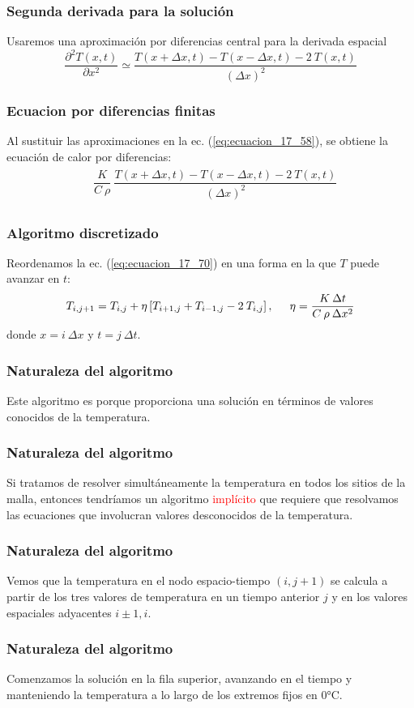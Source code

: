 \begin{frame}
\frametitle{Segunda derivada para la solución}
Usaremos una aproximación por diferencias central para la derivada espacial
\begin{equation}
\dfrac{\partial^{2} T(x,t)}{\partial x^{2}} \simeq \dfrac{T(x + \Delta x, t ) - T(x - \Delta x, t) - 2 \: T(x,t)}{(\Delta x)^{2}}
\label{eq:ecuacion_17_69}
\end{equation}
\end{frame}
\begin{frame}
\frametitle{Ecuacion por diferencias finitas}
Al sustituir las aproximaciones en la ec. (\ref{eq:ecuacion_17_58}), se obtiene la ecuación de calor por diferencias:
\begin{align}
\begin{aligned}
& \dfrac{K}{C \: \rho} \: \dfrac{T(x + \Delta x, t) - T(x - \Delta x, t) - 2 \: T(x,t)}{(\Delta x)^{2}}
\end{aligned}
\label{eq:ecuacion_17_70}
\end{align}
\end{frame}
\begin{frame}
\frametitle{Algoritmo discretizado}
Reordenamos la ec. (\ref{eq:ecuacion_17_70}) en una forma en la que $T$ puede avanzar en $t$:
\begin{equation}
T_{i, j+1} = T_{i, j} + \eta \left[ T_{i+1, j} + T_{i-1, j} - 2 \: T_{i, j} \right], \hspace{0.5cm} \eta = \dfrac{K \: \Delta t}{C \: \rho \: \Delta x^{2}}
\label{eq:ecuacion_17_71}
\end{equation}
donde $x = i \: \Delta x $ y $t = j \: \Delta t$.
\end{frame}
\begin{frame}
\frametitle{Naturaleza del algoritmo}
Este algoritmo es  porque proporciona una solución en términos de valores conocidos de la temperatura.
\end{frame}
\begin{frame}
\frametitle{Naturaleza del algoritmo}
Si tratamos de resolver simultáneamente la temperatura en todos los sitios de la malla, entonces tendríamos un algoritmo \textcolor{red}{implícito} que requiere que resolvamos las ecuaciones que involucran valores desconocidos de la temperatura.
\end{frame}
\begin{frame}
\frametitle{Naturaleza del algoritmo}
Vemos que la temperatura en el nodo espacio-tiempo $(i, j+1)$ se calcula a partir de los tres valores de temperatura en un tiempo anterior $j$ y en los valores espaciales adyacentes $i \pm 1, i$.
\end{frame}
\begin{frame}
\frametitle{Naturaleza del algoritmo}
Comenzamos la solución en la fila superior, avanzando en el tiempo y manteniendo la temperatura a lo largo de los extremos fijos en $0 \si\celsius$.
\end{frame}
